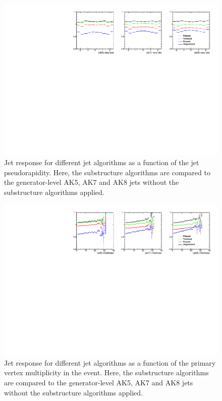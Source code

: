 

\begin{figure}[htb]
\centering
\includegraphics[width=1.0\textwidth]{figs/ptRatioVsEta_mean.pdf}
\caption{Jet response for different jet algorithms as a function of the jet pseudorapidity. Here, the
  substructure algorithms are compared to the
  generator-level AK5, AK7 and AK8 jets without the substructure algorithms applied.}
\label{figs:ptRatiovsEta}
\end{figure}

\begin{figure}[htb]
\centering
\includegraphics[width=1.0\textwidth]{figs/ptRatioVsNV_mean.pdf}
\caption{Jet response for different jet algorithms as a function of the primary vertex multiplicity in the event. Here, the
  substructure algorithms are compared to the
  generator-level AK5, AK7 and AK8 jets without the substructure algorithms applied.}
\label{figs:ptRatiovsPV}
\end{figure}


